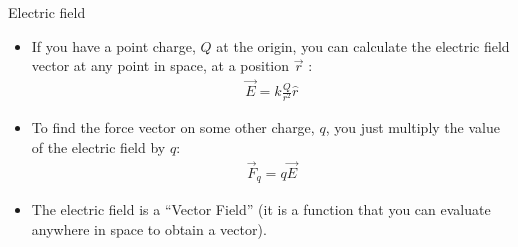 \documentclass[aspectratio=169,
hyperref={colorlinks,urlcolor=blue}
]{beamer}
\begin{document}
\begin{frame}{Electric field}
\begin{itemize}
\item If you have a point charge, $Q$ at the origin, you can calculate the electric field vector at any point in space, at a position $\vec r$ :
\begin{align*}
\vec E = k\frac{Q}{r^2}\hat r
\end{align*}
\item To find the force vector on some other charge, $q$, you just multiply the value of the electric field by $q$:
\begin{align*}
\vec F_q=q\vec E
\end{align*}
\item The electric field is a ``Vector Field'' (it is a function that you can evaluate anywhere in space to obtain a vector).
\end{itemize}
\end{frame}


\end{document}
